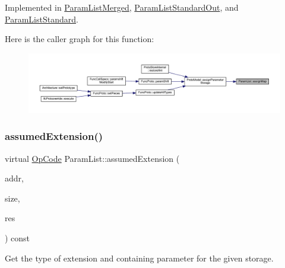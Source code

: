 Implemented in \mbox{\hyperlink{class_param_list_merged_a54e5b3089383a5d80efbd23791992e4b}{Param\+List\+Merged}}, \mbox{\hyperlink{class_param_list_standard_out_af50fd192a944d885223b263e5c31a69e}{Param\+List\+Standard\+Out}}, and \mbox{\hyperlink{class_param_list_standard_a4819bb8291e202e3d11737d586878525}{Param\+List\+Standard}}.

Here is the caller graph for this function\+:
\nopagebreak
\begin{figure}[H]
\begin{center}
\leavevmode
\includegraphics[width=350pt]{class_param_list_ab30f200d65a2c66f434506acc77d384e_icgraph}
\end{center}
\end{figure}
\mbox{\label{class_param_list_a10bf678b80a0e6737a955706418ab645}} 
\subsubsection{\texorpdfstring{assumedExtension()}{assumedExtension()}}
{\footnotesize\ttfamily virtual \mbox{\hyperlink{opcodes_8hh_abeb7dfb0e9e2b3114e240a405d046ea7}{Op\+Code}} Param\+List\+::assumed\+Extension (\begin{DoxyParamCaption}\item[{const \mbox{\hyperlink{class_address}{Address}} \&}]{addr,  }\item[{int4}]{size,  }\item[{\mbox{\hyperlink{struct_varnode_data}{Varnode\+Data}} \&}]{res }\end{DoxyParamCaption}) const\hspace{0.3cm}{\ttfamily [pure virtual]}}



Get the type of extension and containing parameter for the given storage. 


